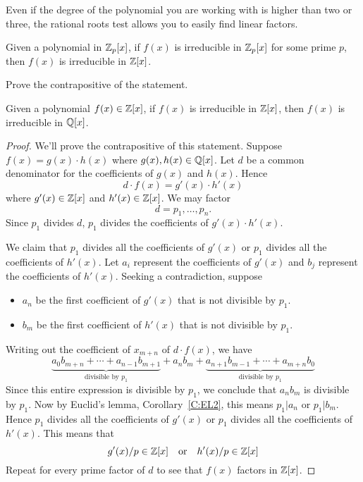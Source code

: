 \documentclass{ximera}
\begin{document}
Even if the degree of the polynomial you are working with is higher
than two or three, the rational roots test allows you to easily find
linear factors.


\begin{lemma}\label{L:RCP}
  Given a polynomial in $\mathbb Z_p[x]$, if $f(x)$ is irreducible in
  $\mathbb Z_p[x]$ for some prime $p$, then $f(x)$ is irreducible in $\mathbb Z[x]$.
  \begin{sketch}
    Prove the contrapositive of the statement.
  \end{sketch}
\end{lemma}


\begin{lemma}\label{L:G}
  Given a polynomial $f(x)\in\mathbb Z[x]$, if $f(x)$ is irreducible in
  $\mathbb Z[x]$, then $f(x)$ is irreducible in $\mathbb Q[x]$.
  \begin{proof}
    We'll prove the contrapositive of this statement. Suppose $f(x) =
    g(x)\cdot h(x)$ where $g(x),h(x)\in\mathbb Q[x]$. Let $d$ be a common
    denominator for the coefficients of $g(x)$ and $h(x)$. Hence
    \[
    d\cdot f(x) = g'(x)\cdot h'(x)
    \]
    where $g'(x)\in \mathbb Z[x]$ and $h'(x) \in\mathbb Z[x]$. We may factor
    \[
    d = p_1,\dots, p_n.
    \]
    Since $p_1$ divides $d$, $p_1$ divides the coefficients of
    $g'(x)\cdot h'(x)$.


    We claim that $p_1$ divides all the coefficients of $g'(x)$ or
    $p_1$ divides all the coefficients of $h'(x)$.  Let $a_i$
    represent the coefficients of $g'(x)$ and $b_j$ represent the
    coefficients of $h'(x)$. Seeking a contradiction, suppose 
    \begin{itemize}
      \item $a_n$ be the first coefficient of $g'(x)$ that is not
        divisible by $p_1$.
      \item $b_m$ be the first coefficient of $h'(x)$ that is not
        divisible by $p_1$.
    \end{itemize}
    Writing out the coefficient of $x_{m+n}$ of $d\cdot f(x)$, we have
    \[
    \underbrace{a_0b_{m+n}  + \cdots + a_{n-1}b_{m+1}}_{\text{divisible by $p_1$}} + a_nb_m + \underbrace{a_{n+1}b_{m-1} + \cdots + a_{m+n} b_0}_{\text{divisible by $p_1$}}
    \]
    Since this entire expression is divisible by $p_1$, we conclude
    that $a_nb_m$ is divisible by $p_1$. Now by Euclid's lemma,
    Corollary~\ref{C:EL2}, this means $p_1|a_n$ or $p_1|b_m$. Hence $p_1$
    divides all the coefficients of $g'(x)$ or $p_1$ divides all the
    coefficients of $h'(x)$. This means that
    \[
    g'(x)/p \in \mathbb Z[x] \quad\text{or}\quad h'(x)/p \in \mathbb Z[x]
    \]
    Repeat for every prime factor of $d$ to see that $f(x)$ factors in
    $\mathbb Z[x]$.
  \end{proof}
\end{lemma}
\end{document}
